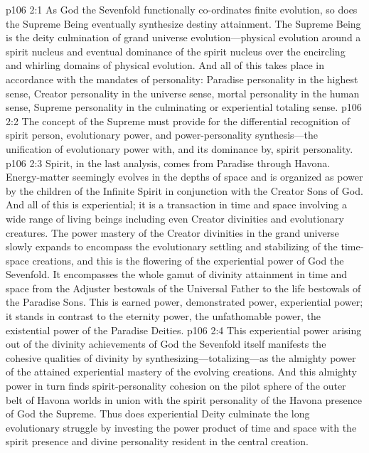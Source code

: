 \vs p106 2:1 As God the Sevenfold functionally co\hyp{}ordinates finite evolution, so does the Supreme Being eventually synthesize destiny attainment. The Supreme Being is the deity culmination of grand universe evolution---physical evolution around a spirit nucleus and eventual dominance of the spirit nucleus over the encircling and whirling domains of physical evolution. And all of this takes place in accordance with the mandates of personality: Paradise personality in the highest sense, Creator personality in the universe sense, mortal personality in the human sense, Supreme personality in the culminating or experiential totaling sense.
\pc \vs p106 2:2 The concept of the Supreme must provide for the differential recognition of spirit person, evolutionary power, and power\hyp{}personality synthesis---the unification of evolutionary power with, and its dominance by, spirit personality.
\vs p106 2:3 Spirit, in the last analysis, comes from Paradise through Havona. Energy\hyp{}matter seemingly evolves in the depths of space and is organized as power by the children of the Infinite Spirit in conjunction with the Creator Sons of God. And all of this is experiential; it is a transaction in time and space involving a wide range of living beings including even Creator divinities and evolutionary creatures. The power mastery of the Creator divinities in the grand universe slowly expands to encompass the evolutionary settling and stabilizing of the time\hyp{}space creations, and this is the flowering of the experiential power of God the Sevenfold. It encompasses the whole gamut of divinity attainment in time and space from the Adjuster bestowals of the Universal Father to the life bestowals of the Paradise Sons. This is earned power, demonstrated power, experiential power; it stands in contrast to the eternity power, the unfathomable power, the existential power of the Paradise Deities.
\vs p106 2:4 This experiential power arising out of the divinity achievements of God the Sevenfold itself manifests the cohesive qualities of divinity by synthesizing---totalizing---as the almighty power of the attained experiential mastery of the evolving creations. And this almighty power in turn finds spirit\hyp{}personality cohesion on the pilot sphere of the outer belt of Havona worlds in union with the spirit personality of the Havona presence of God the Supreme. Thus does experiential Deity culminate the long evolutionary struggle by investing the power product of time and space with the spirit presence and divine personality resident in the central creation.
